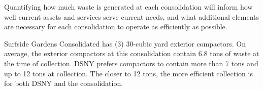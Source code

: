 
    Quantifying how much waste is generated at each consolidation will inform how well current assets and services serve current needs, and what additional elements are necessary for each consolidation to operate as efficiently as possible.
    
    Surfside Gardens Consolidated has (3) 30-cubic yard exterior compactors. On average, the exterior compactors at this consolidation contain 6.8 tons of waste at the time of collection. DSNY prefers compactors to contain more than 7 tons and up to 12 tons at collection. The closer to 12 tons, the more efficient collection is for both DSNY and the consolidation.